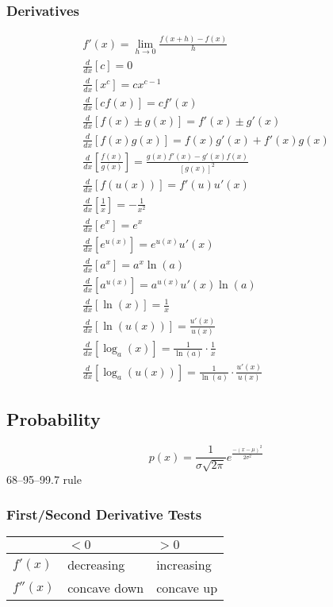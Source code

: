 \documentclass[letterpaper,12pt,fleqn]{article}
\newcommand{\m}{\mu}
\renewcommand{\o}{\sigma}
\begin{document}
\subsubsection*{Derivatives}

\begin{gather*}
  f'(x)=\lim_{h\to0}\frac{f(x+h)-f(x)}{h} \\
  \frac{d}{dx}\left[c\right]=0 \\
  \frac{d}{dx}\left[x^c\right]=cx^{c-1} \\
  \frac{d}{dx}\left[cf(x)\right]=cf'(x) \\
  \frac{d}{dx}\left[f(x)\pm g(x)\right]=f'(x)\pm g'(x) \\
  \frac{d}{dx}\left[f(x)g(x)\right]=f(x)g'(x)+f'(x)g(x) \\
  \frac{d}{dx}\left[\frac{f(x)}{g(x)}\right]=\frac{g(x)f'(x)-g'(x)f(x)}{[g(x)]^2} \\
  \frac{d}{dx}\left[f(u(x))\right]=f'(u)u'(x) \\
  \frac{d}{dx}\left[\frac{1}{x}\right]=-\frac{1}{x^2} \\
  \frac{d}{dx}\left[e^x\right]=e^x \\
  \frac{d}{dx}\left[e^{u(x)}\right]=e^{u(x)}u'(x) \\
  \frac{d}{dx}\left[a^x\right]=a^x\ln(a) \\
  \frac{d}{dx}\left[a^{u(x)}\right]=a^{u(x)}u'(x)\ln(a) \\
  \frac{d}{dx}\left[\ln(x)\right]=\frac{1}{x} \\
  \frac{d}{dx}\left[\ln(u(x))\right]=\frac{u'(x)}{u(x)} \\
  \frac{d}{dx}\left[\log_a(x)\right]=\frac{1}{\ln(a)}\cdot\frac{1}{x} \\
  \frac{d}{dx}\left[\log_a(u(x))\right]=\frac{1}{\ln(a)}\cdot\frac{u'(x)}{u(x)}
\end{gather*}

\subsection*{Probability}

\[p(x)=\frac{1}{\o\sqrt{2\pi}}e^{\frac{-(x-\m)^2}{2\o^2}}\]
68--95--99.7 rule

\subsubsection*{First/Second Derivative Tests}

\begin{tabular}{|l|l|l|}
  \hline
  & \(<0\) & \(>0\) \\
  \hline
  \(f'(x)\) & decreasing & increasing \\
  \hline
  \(f''(x)\) & concave down & concave up \\
  \hline
\end{tabular}
\end{document}
